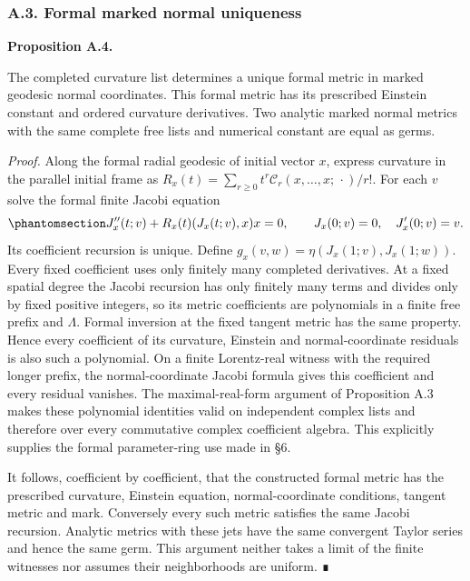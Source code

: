 \documentclass[
  english,
  11pt,
  reqno]{amsart}
\makeatletter
\newcommand{\pandocstatementheading}[1]{%
  \par\addpenalty{\@beginparpenalty}%
  \addvspace{.5\baselineskip plus .2\baselineskip minus .2\baselineskip}%
  {\normalfont\bfseries #1\par}%
  \nobreak\@afterindenttrue\@afterheading
}
\makeatother
\begin{document}
\subsubsection{A.3. Formal marked normal
uniqueness}\label{a.3.-formal-marked-normal-uniqueness}

\pandocstatementheading{\protect{}\label{prop:gg-formal-normal-uniqueness}Proposition A.4.}

The completed curvature list determines a unique formal metric in marked
geodesic normal coordinates. This formal metric has its prescribed
Einstein constant and ordered curvature derivatives. Two analytic marked
normal metrics with the same complete free lists and numerical constant
are equal as germs.

\emph{Proof.} Along the formal radial geodesic of initial vector \(x\),
express curvature in the parallel initial frame as
\(R_x(t)=\sum_{r\ge0}t^r\mathcal C_r(x,\ldots,x;\,\cdot)/r!\). For each
\(v\) solve the formal finite Jacobi equation
\begin{equation}\protect\phantomsection\label{eq:gg-formal-radial-jacobi}{
 J_x''(t;v)+R_x(t)(J_x(t;v),x)x=0,\qquad
 J_x(0;v)=0,\quad J_x'(0;v)=v .
}\end{equation} Its coefficient recursion is unique. Define
\(g_x(v,w)=\eta(J_x(1;v),J_x(1;w))\). Every fixed coefficient uses only
finitely many completed derivatives. At a fixed spatial degree the
Jacobi recursion has only finitely many terms and divides only by fixed
positive integers, so its metric coefficients are polynomials in a
finite free prefix and \(\Lambda\). Formal inversion at the fixed
tangent metric has the same property. Hence every coefficient of its
curvature, Einstein and normal-coordinate residuals is also such a
polynomial. On a finite Lorentz-real witness with the required longer
prefix, the normal-coordinate Jacobi formula gives this coefficient and
every residual vanishes. The maximal-real-form argument of Proposition
A.3 makes these polynomial identities valid on independent complex lists
and therefore over every commutative complex coefficient algebra. This
explicitly supplies the formal parameter-ring use made in §6.

It follows, coefficient by coefficient, that the constructed formal
metric has the prescribed curvature, Einstein equation,
normal-coordinate conditions, tangent metric and mark. Conversely every
such metric satisfies the same Jacobi recursion. Analytic metrics with
these jets have the same convergent Taylor series and hence the same
germ. This argument neither takes a limit of the finite witnesses nor
assumes their neighborhoods are uniform. ∎
\end{document}
